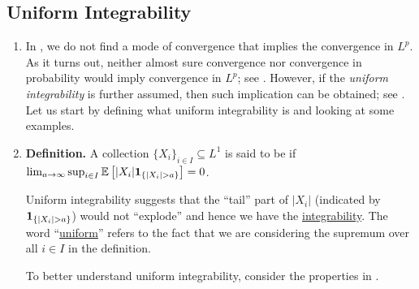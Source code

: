 \subsection{Uniform Integrability}
\label{subsect:uniform-int}
\begin{enumerate}
\item In , we do not find a mode of convergence that
implies the convergence in \(L^p\). As it turns out, neither almost sure
convergence nor convergence in probability would imply convergence in \(L^p\);
see . However, if the \emph{uniform
integrability} is further assumed, then such implication can be obtained; see
. Let us start by defining what uniform
integrability is and looking at some examples.
\item \textbf{Definition.} A collection \(\{X_i\}_{i\in
I}\subseteq L^1\) is said to be  if \(
\lim_{a\to\infty}\sup_{i\in I}\expv{|X_i|\indicset{|X_i|>a}}=0\).

\begin{intuition}
Uniform integrability suggests that the ``tail'' part of \(|X_i|\)
(indicated by \(\indicset{|X_i|>a}\)) would not ``explode'' and hence we have
the \underline{integrability}. The word ``\underline{uniform}'' refers to the
fact that we are considering the supremum over all \(i\in I\) in the definition.
\end{intuition}

To better understand uniform integrability, consider the properties in
.


\end{enumerate}
